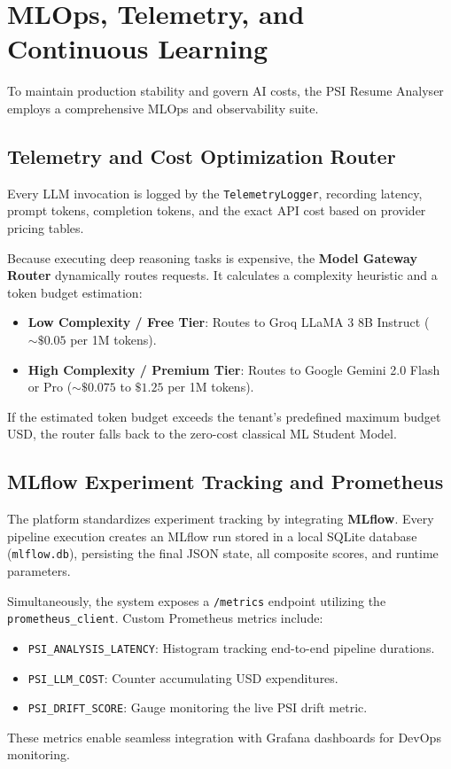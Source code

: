 \section{MLOps, Telemetry, and Continuous Learning}\label{sec:mlops}

To maintain production stability and govern AI costs, the PSI Resume Analyser employs a comprehensive MLOps and observability suite.

\subsection{Telemetry and Cost Optimization Router}
Every LLM invocation is logged by the \texttt{TelemetryLogger}, recording latency, prompt tokens, completion tokens, and the exact API cost based on provider pricing tables. 

Because executing deep reasoning tasks is expensive, the \textbf{Model Gateway Router} dynamically routes requests. It calculates a complexity heuristic and a token budget estimation:
\begin{itemize}
    \item \textbf{Low Complexity / Free Tier}: Routes to Groq LLaMA 3 8B Instruct ($\sim \$0.05$ per 1M tokens).
    \item \textbf{High Complexity / Premium Tier}: Routes to Google Gemini 2.0 Flash or Pro ($\sim \$0.075$ to $\$1.25$ per 1M tokens).
\end{itemize}
If the estimated token budget exceeds the tenant's predefined maximum budget USD, the router falls back to the zero-cost classical ML Student Model.

\subsection{MLflow Experiment Tracking and Prometheus}
The platform standardizes experiment tracking by integrating \textbf{MLflow}. Every pipeline execution creates an MLflow run stored in a local SQLite database (\texttt{mlflow.db}), persisting the final JSON state, all composite scores, and runtime parameters.

Simultaneously, the system exposes a \texttt{/metrics} endpoint utilizing the \texttt{prometheus\_client}. Custom Prometheus metrics include:
\begin{itemize}
    \item \texttt{PSI\_ANALYSIS\_LATENCY}: Histogram tracking end-to-end pipeline durations.
    \item \texttt{PSI\_LLM\_COST}: Counter accumulating USD expenditures.
    \item \texttt{PSI\_DRIFT\_SCORE}: Gauge monitoring the live PSI drift metric.
\end{itemize}
These metrics enable seamless integration with Grafana dashboards for DevOps monitoring.


